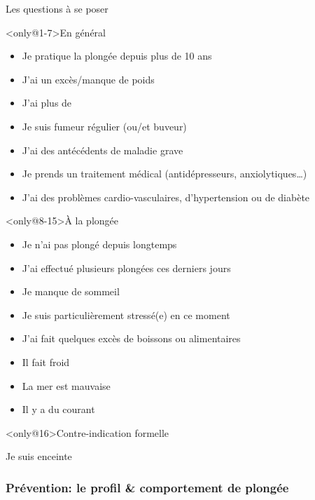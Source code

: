 \begin{frame}{Les questions à se poser}
\begin{block}<only@1-7>{En général}
\begin{itemize}[<+->]
\item Je pratique la plongée depuis plus de 10 ans
\item J'ai un excès/manque de poids
\item J'ai plus de 
\item Je suis fumeur régulier (ou/et buveur)
\item J'ai des antécédents de maladie grave
\item Je prends un traitement médical (antidépresseurs, anxiolytiques\dots) 
\item J'ai des problèmes cardio-vasculaires, d'hypertension ou de diabète
\end{itemize}
\end{block}%
\begin{block}<only@8-15>{À la plongée}
\begin{itemize}[<+->]
\item Je n'ai pas plongé depuis longtemps 
\item J'ai effectué plusieurs plongées ces derniers jours 
\item Je manque de sommeil 
\item Je suis particulièrement stressé(e) en ce moment 
\item J'ai fait quelques excès de boissons ou alimentaires 
\item Il fait froid
\item La mer est mauvaise
\item Il y a du courant
\end{itemize}
\end{block}%
\begin{alertblock}<only@16>{Contre-indication formelle}
\centering\rule[-1cm]{0pt}{2cm}%
\Large Je suis enceinte
\end{alertblock}
\end{frame}

\subsubsection{Prévention: le profil \& comportement de plongée}

